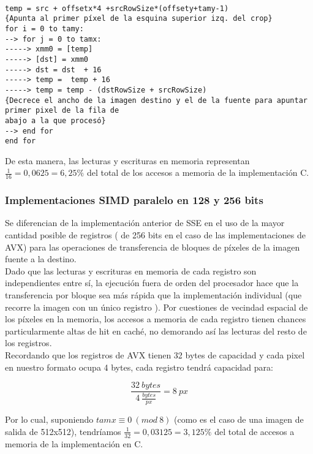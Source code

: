 \begin{codesnippet}
\begin{verbatim}

temp = src + offsetx*4 +srcRowSize*(offsety+tamy-1)
{Apunta al primer píxel de la esquina superior izq. del crop}
for i = 0 to tamy:
--> for j = 0 to tamx:
-----> xmm0 = [temp]
-----> [dst] = xmm0
-----> dst = dst  + 16
-----> temp =  temp + 16
-----> temp = temp - (dstRowSize + srcRowSize)
{Decrece el ancho de la imagen destino y el de la fuente para apuntar primer pixel de la fila de
abajo a la que procesó}
--> end for
end for

\end{verbatim}
\end{codesnippet}



De esta manera, las lecturas y escrituras en memoria representan $\frac{1}{16} = 0,0625 =  6,25\%$ del total de los accesos a memoria de la implementación C.


\subsubsection{Implementaciones SIMD paralelo en 128 y 256 bits}
Se diferencian de la implementación anterior de SSE en el uso de la mayor cantidad posible de registros \xmm{} (\ymm{} de 256 bits en el caso de las implementaciones de AVX) para las operaciones de transferencia de bloques de píxeles de la imagen fuente a la destino.
\\

Dado que las lecturas y escrituras en memoria de cada registro son independientes entre sí, la ejecución fuera de orden del procesador hace que la transferencia por bloque sea más rápida que la implementación individual (que recorre la imagen con un único registro \xmm{}). Por cuestiones de vecindad espacial de los píxeles en la memoria, los accesos a memoria de cada registro tienen chances particularmente altas de hit en caché, no demorando así las lecturas del resto de los registros.
\\

Recordando que los registros de AVX tienen 32 bytes de capacidad y cada pixel en nuestro formato ocupa 4 bytes, cada registro \ymm{} tendrá capacidad para:

$$ \frac{32 \ bytes}{4 \ \frac{bytes}{px}} = 8 \ px $$

Por lo cual, suponiendo $ tamx \equiv 0 \ (mod \ 8) $ (como es el caso de una imagen de salida de 512x512), tendríamos $\frac{1}{32} = 0,03125 =  3,125\%$ del total de accesos a memoria de la implementación en C.


